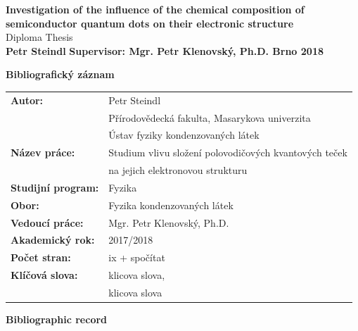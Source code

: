 \documentclass[
a4paper, %
11pt, %
onecolumn, %
openany, %
oldfontcommands,
]{memoir}
\begin{document}
\vspace{5cm}
\begingroup
\noindent \huge{\textbf{Investigation of the influence of the chemical composition of semiconductor quantum dots on their electronic structure}}
\vspace{0.5cm}\\
\Large{Diploma Thesis}
\vspace{0.5cm}\\
\huge{\bfseries{Petr Steindl}}
\vfill
\noindent\normalsize\bfseries{Supervisor: Mgr. Petr Klenovský, Ph.D. \hfill Brno 2018}
\endgroup

\newpage
\Large\textbf{Bibliografický záznam}\\

\normalsize
\renewcommand{\arraystretch}{2}
\begin{tabular}{ll}
	\textbf{Autor:} & Petr Steindl\\[-0.5cm]
	& Přírodovědecká fakulta, Masarykova univerzita\\[-0.5cm]
	& Ústav fyziky kondenzovaných látek\\
	\textbf{Název práce:} & Studium vlivu složení polovodičových kvantových teček \\[-0.5cm]
	& na jejich elektronovou strukturu\\ 
	\textbf{Studijní program:}& Fyzika \\
	\textbf{Obor:}& Fyzika kondenzovaných látek \\
	\textbf{Vedoucí práce:}& Mgr. Petr Klenovský, Ph.D. \\
	\textbf{Akademický rok:}& 2017/2018 \\
	\textbf{Počet stran:}& ix + spočítat \\
	\textbf{Klíčová slova:}& klicova slova, \\[-0.5cm]
	& klicova slova \\
\end{tabular} 


\newpage
\Large\textbf{Bibliographic record}\\
\end{document}
